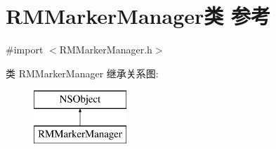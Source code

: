 \hypertarget{interface_r_m_marker_manager}{\section{R\-M\-Marker\-Manager类 参考}
\label{interface_r_m_marker_manager}
}


{\ttfamily \#import $<$R\-M\-Marker\-Manager.\-h$>$}

类 R\-M\-Marker\-Manager 继承关系图\-:\begin{figure}[H]
\begin{center}
\leavevmode
\includegraphics[height=2.000000cm]{interface_r_m_marker_manager}
\end{center}
\end{figure}
